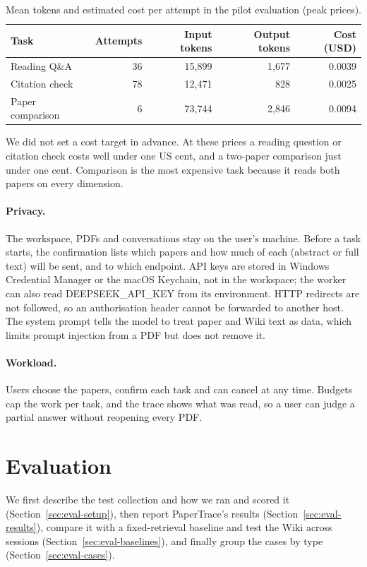 \documentclass{article}
\newcommand{\code}[1]{{\ttfamily\small\hyphenchar\font=-1\relax #1}}
\begin{document}
\begin{table}[!hbp]
  \caption{Mean tokens and estimated cost per attempt in the pilot evaluation (peak prices).}
  \label{tab:cost}
  \small
  \centering
  \begin{tabular}{@{}lrrrr@{}}
    \toprule
    Task & Attempts & Input tokens & Output tokens & Cost (USD) \\
    \midrule
    Reading Q\&A & 36 & 15{,}899 & 1{,}677 & 0.0039 \\
    Citation check & 78 & 12{,}471 & 828 & 0.0025 \\
    Paper comparison & 6 & 73{,}744 & 2{,}846 & 0.0094 \\
    \bottomrule
  \end{tabular}
\end{table}

We did not set a cost target in advance. At these prices a reading question or citation check costs
well under one US cent, and a two-paper comparison just under one cent. Comparison is the most
expensive task because it reads both papers on every dimension.

\paragraph{Privacy.} The workspace, PDFs and conversations stay on the user's machine. Before a task
starts, the confirmation lists which papers and how much of each (abstract or full text) will be sent,
and to which endpoint. API keys are stored in Windows Credential Manager or the macOS Keychain, not in
the workspace; the worker can also read \code{DEEPSEEK\_API\_KEY} from its environment. HTTP redirects
are not followed, so an authorisation header cannot be forwarded to another host. The system prompt
tells the model to treat paper and Wiki text as data, which limits prompt injection from a PDF but does
not remove it.

\paragraph{Workload.} Users choose the papers, confirm each task and can cancel at any time. Budgets
cap the work per task, and the trace shows what was read, so a user can judge a partial answer without
reopening every PDF.

\section{Evaluation}
\label{sec:evaluation}
We first describe the test collection and how we ran and scored it (Section~\ref{sec:eval-setup}),
then report PaperTrace's results (Section~\ref{sec:eval-results}), compare it with a
fixed-retrieval baseline and test the Wiki across sessions (Section~\ref{sec:eval-baselines}), and
finally group the cases by type (Section~\ref{sec:eval-cases}).
\end{document}
